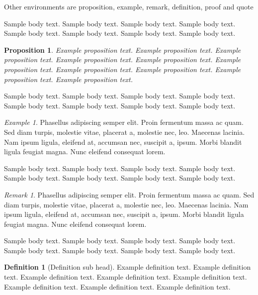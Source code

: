 \documentclass[sn-basic,pdflatex]{sn-jnl}
\newtheorem{proposition}[theorem]{Proposition}%
\theoremstyle{remark}
\newtheorem{example}{Example}%
\newtheorem{remark}{Remark}%
\theoremstyle{definition}
\newtheorem{definition}{Definition}%
\begin{document}
Other environments are proposition, example, remark, definition, proof
and quote

Sample body text. Sample body text. Sample body text. Sample body text.
Sample body text. Sample body text. Sample body text. Sample body text.

\begin{proposition}
Example proposition text. Example proposition text. Example proposition
text. Example proposition text. Example proposition text. Example
proposition text. Example proposition text. Example proposition text.
Example proposition text. Example proposition text.

\end{proposition}

Sample body text. Sample body text. Sample body text. Sample body text.
Sample body text. Sample body text. Sample body text. Sample body text.

\begin{example}
Phasellus adipiscing semper elit. Proin fermentum massa ac quam. Sed
diam turpis, molestie vitae, placerat a, molestie nec, leo. Maecenas
lacinia. Nam ipsum ligula, eleifend at, accumsan nec, suscipit a, ipsum.
Morbi blandit ligula feugiat magna. Nunc eleifend consequat lorem.

\end{example}

Sample body text. Sample body text. Sample body text. Sample body text.
Sample body text. Sample body text. Sample body text. Sample body text.

\begin{remark}
Phasellus adipiscing semper elit. Proin fermentum massa ac quam. Sed
diam turpis, molestie vitae, placerat a, molestie nec, leo. Maecenas
lacinia. Nam ipsum ligula, eleifend at, accumsan nec, suscipit a, ipsum.
Morbi blandit ligula feugiat magna. Nunc eleifend consequat lorem.

\end{remark}

Sample body text. Sample body text. Sample body text. Sample body text.
Sample body text. Sample body text. Sample body text. Sample body text.

\begin{definition}[Definition sub head]
Example definition text. Example definition text. Example definition
text. Example definition text. Example definition text. Example
definition text. Example definition text. Example definition text.

\end{definition}
\end{document}
